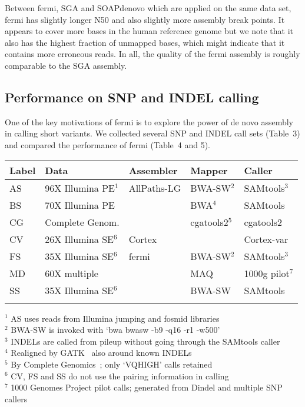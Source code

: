 \documentclass{bioinfo}
\begin{document}
Between fermi, SGA and SOAPdenovo which are applied on the same data set,
fermi has slightly longer N50 and also slightly more assembly break points.
It appears to cover more bases in the human reference genome but we note that
it also has the highest fraction of unmapped bases, which might indicate that
it contains more erroneous reads. In all, the quality of the fermi assembly
is roughly comparable to the SGA assembly.

\subsection{Performance on SNP and INDEL calling}

One of the key motivations of fermi is to explore the power of de novo assembly
in calling short variants. We collected several SNP and INDEL call sets (Table~3)
and compared the performance of fermi (Table~4 and 5).

\begin{table}[!htb]
{\begin{tabular}{lllll}
\toprule
Label & Data & Assembler & Mapper & Caller \\
\midrule
AS & 96X Illumina PE$^1$ & AllPaths-LG & BWA-SW$^2$ & SAMtools$^3$ \\
BS & 70X Illumina PE & & BWA$^4$ & SAMtools \\
CG & Complete Genom.& & cgatools2$^5$ & cgatools2 \\
CV & 26X Illumina SE$^6$ & Cortex & & Cortex-var \\
FS & 35X Illumina SE$^6$ & fermi & BWA-SW$^2$ & SAMtools$^3$ \\
MD & 60X multiple        & & MAQ & 1000g pilot$^7$ \\
SS & 35X Illumina SE$^6$ & & BWA-SW & SAMtools \\
\botrule
\end{tabular}}{
$^1$ AS uses reads from Illumina jumping and fosmid libraries\\
$^2$ BWA-SW is invoked with `bwa bwasw -b9 -q16 -r1 -w500'\\
$^3$ INDELs are called from pileup without going through the SAMtools caller\\
$^4$ Realigned by GATK~\citep{Depristo:2011vn} also around known INDELs\\
$^5$ By Complete Genomics~\citep{Drmanac:2010ly}; only `VQHIGH' calls retained\\
$^6$ CV, FS and SS do not use the pairing information in calling\\
$^7$ 1000 Genomes Project pilot calls; generated from Dindel and multiple SNP callers\\
}
\end{table}
\end{document}
